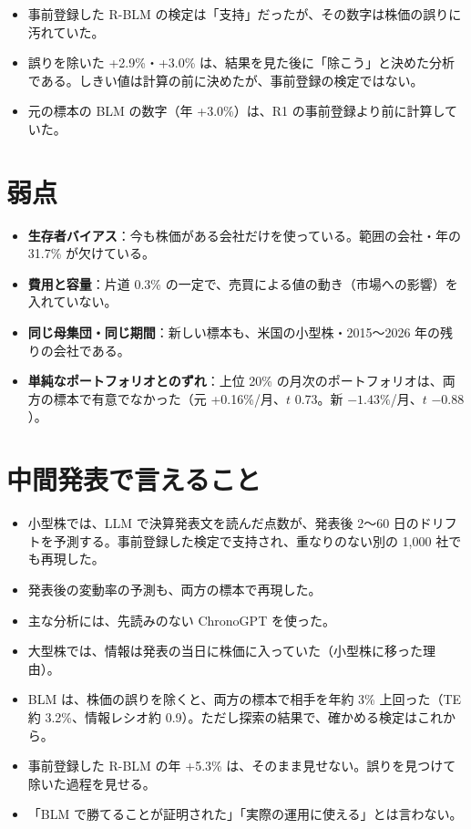 \documentclass[xelatex,ja=standard,jafont=haranoaji,a4paper,10pt]{bxjsreport}
\begin{document}
\begin{itemize}
\item 事前登録した R-BLM の検定は「支持」だったが、その数字は株価の誤りに汚れていた。
\item 誤りを除いた +2.9\%・+3.0\% は、結果を見た後に「除こう」と決めた分析である。しきい値は計算の前に決めたが、事前登録の検定ではない。
\item 元の標本の BLM の数字（年 +3.0\%）は、R1 の事前登録より前に計算していた。
\end{itemize}

\section{弱点}

\begin{itemize}
\item \textbf{生存者バイアス}：今も株価がある会社だけを使っている。範囲の会社・年の 31.7\% が欠けている。
\item \textbf{費用と容量}：片道 0.3\% の一定で、売買による値の動き（市場への影響）を入れていない。
\item \textbf{同じ母集団・同じ期間}：新しい標本も、米国の小型株・2015〜2026 年の残りの会社である。
\item \textbf{単純なポートフォリオとのずれ}：上位 20\% の月次のポートフォリオは、両方の標本で有意でなかった（元 +0.16\%/月、$t$ 0.73。新 $-1.43\%$/月、$t$ $-0.88$）。
\end{itemize}

\section{中間発表で言えること}

\begin{keybox}[言い切ってよいこと]
\begin{itemize}
\item 小型株では、LLM で決算発表文を読んだ点数が、発表後 2〜60 日のドリフトを予測する。事前登録した検定で支持され、重なりのない別の 1,000 社でも再現した。
\item 発表後の変動率の予測も、両方の標本で再現した。
\item 主な分析には、先読みのない ChronoGPT を使った。
\item 大型株では、情報は発表の当日に株価に入っていた（小型株に移った理由）。
\end{itemize}
\end{keybox}

\begin{notebox}
\begin{itemize}
\item BLM は、株価の誤りを除くと、両方の標本で相手を年約 3\% 上回った（TE 約 3.2\%、情報レシオ約 0.9）。ただし探索の結果で、確かめる検定はこれから。
\item 事前登録した R-BLM の年 +5.3\% は、そのまま見せない。誤りを見つけて除いた過程を見せる。
\item 「BLM で勝てることが証明された」「実際の運用に使える」とは言わない。
\end{itemize}
\end{notebox}
\end{document}
